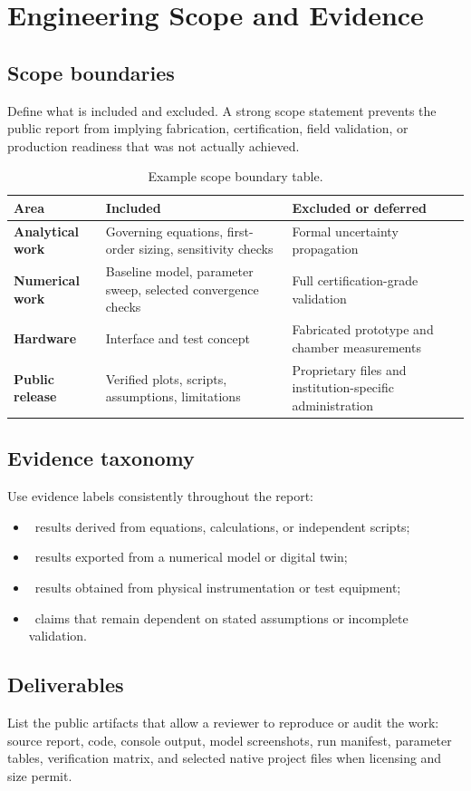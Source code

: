 \chapter{Engineering Scope and Evidence}

\section{Scope boundaries}
Define what is included and excluded. A strong scope statement prevents the public
report from implying fabrication, certification, field validation, or production
readiness that was not actually achieved.

\begin{table}[H]
\centering
\caption{Example scope boundary table.}
\label{tab:scope}
\begin{tabularx}{\textwidth}{>{\bfseries}p{}XX}
\toprule
Area & Included & Excluded or deferred \\
\midrule
Analytical work & Governing equations, first-order sizing, sensitivity checks & Formal uncertainty propagation \\
Numerical work & Baseline model, parameter sweep, selected convergence checks & Full certification-grade validation \\
Hardware & Interface and test concept & Fabricated prototype and chamber measurements \\
Public release & Verified plots, scripts, assumptions, limitations & Proprietary files and institution-specific administration \\
\bottomrule
\end{tabularx}
\end{table}

\section{Evidence taxonomy}
Use evidence labels consistently throughout the report:

\begin{itemize}[leftmargin=2em]
\item \AnalyticalTag\ results derived from equations, calculations, or independent scripts;
\item \SimulatedTag\ results exported from a numerical model or digital twin;
\item \MeasuredTag\ results obtained from physical instrumentation or test equipment;
\item \QualifiedTag\ claims that remain dependent on stated assumptions or incomplete validation.
\end{itemize}

\section{Deliverables}
List the public artifacts that allow a reviewer to reproduce or audit the work: source
report, code, console output, model screenshots, run manifest, parameter tables,
verification matrix, and selected native project files when licensing and size permit.

